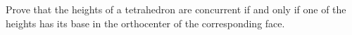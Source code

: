 Prove that the heights of a tetrahedron are concurrent if and only if
one of the heights has its base in the orthocenter of the corresponding face.
